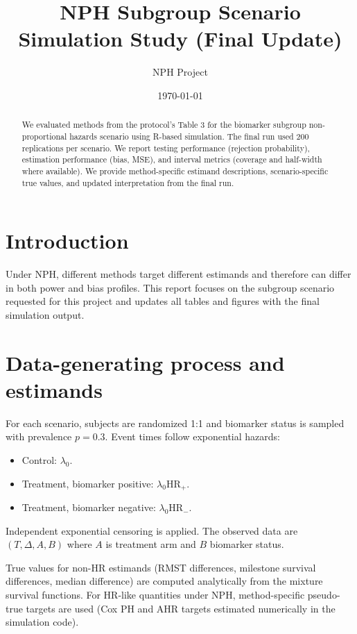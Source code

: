 \documentclass[11pt]{article}
\title{NPH Subgroup Scenario Simulation Study (Final Update)}
\author{NPH Project}
\date{\today}
\begin{document}
\maketitle

\begin{abstract}
We evaluated methods from the protocol's Table 3 for the biomarker subgroup non-proportional hazards scenario using R-based simulation. The final run used 200 replications per scenario. We report testing performance (rejection probability), estimation performance (bias, MSE), and interval metrics (coverage and half-width where available). We provide method-specific estimand descriptions, scenario-specific true values, and updated interpretation from the final run.
\end{abstract}

\section{Introduction}
Under NPH, different methods target different estimands and therefore can differ in both power and bias profiles. This report focuses on the subgroup scenario requested for this project and updates all tables and figures with the final simulation output.

\section{Data-generating process and estimands}
For each scenario, subjects are randomized 1:1 and biomarker status is sampled with prevalence $p=0.3$. Event times follow exponential hazards:
\begin{itemize}
\item Control: $\lambda_0$.
\item Treatment, biomarker positive: $\lambda_0 \mathrm{HR}_{+}$.
\item Treatment, biomarker negative: $\lambda_0 \mathrm{HR}_{-}$.
\end{itemize}
Independent exponential censoring is applied. The observed data are $(T,\Delta,A,B)$ where $A$ is treatment arm and $B$ biomarker status.

True values for non-HR estimands (RMST differences, milestone survival differences, median difference) are computed analytically from the mixture survival functions. For HR-like quantities under NPH, method-specific pseudo-true targets are used (Cox PH and AHR targets estimated numerically in the simulation code).
\end{document}
